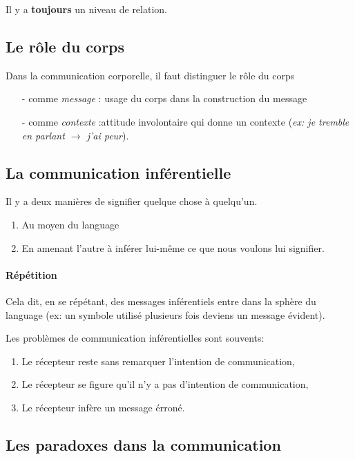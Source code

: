 \documentclass[11pt]{article} %
\begin{document}
Il y a \textbf{toujours} un niveau de relation.

\subsection{Le rôle du corps}

Dans la communication corporelle, il faut distinguer le rôle du corps
\begin{itemize}
    \item[-] comme \textit{message} : usage du corps dans la construction du
message 
    \item[-] comme \textit{contexte} :attitude involontaire qui
donne un contexte (\textit{ex: je tremble en parlant $\rightarrow$ j'ai
peur}).
\end{itemize}


\subsection{La communication inférentielle}

Il y a deux manières de signifier quelque chose à quelqu'un.
\begin{enumerate}
    \item Au moyen du language
    \item En amenant l'autre à inférer lui-même ce que nous voulons lui
        signifier.
\end{enumerate}

\paragraph{Répétition} Cela dit, en se répétant, des messages inférentiels entre dans la
sphère du language (ex: un symbole utilisé plusieurs fois deviens un
message évident).


Les problèmes de communication inférentielles sont souvents:
\begin{enumerate}
    \item Le récepteur reste sans remarquer l'intention de communication,
    \item Le récepteur se figure qu'il n'y a pas d'intention de communication,
    \item Le récepteur infère un message érroné.
\end{enumerate}

\subsection{Les paradoxes dans la communication}
\end{document}
